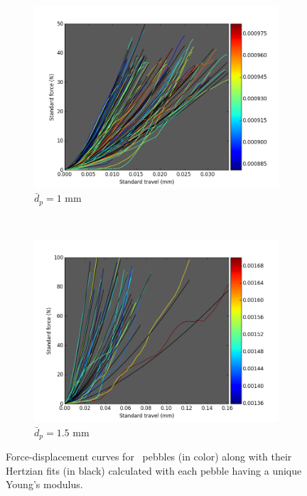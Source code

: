 \begin{figure}
        \centering
        \begin{subfigure}[b]{\doubleimagewidth}
                \includegraphics[width=\textwidth]{chapters/figures/nfri-1mm-hertz-colormap.png}
                \caption{$\bar{d}_p = 1$ mm}
                \label{fig:nfri-1-exp-hertz}
        \end{subfigure}
        ~
        \begin{subfigure}[b]{\doubleimagewidth}
                \includegraphics[width=\textwidth]{chapters/figures/nfri-1.5mm-hertz-colormap.png}
                \caption{$\bar{d}_p = 1.5$ mm}
                \label{fig:nfri-1.5-exp-hertz}
        \end{subfigure}
        \caption{Force-displacement curves for \lit~pebbles (in color) along with their Hertzian fits (in black) calculated with each pebble having a unique Young's modulus.}\label{fig:nfri-exp-hertz}
\end{figure}

